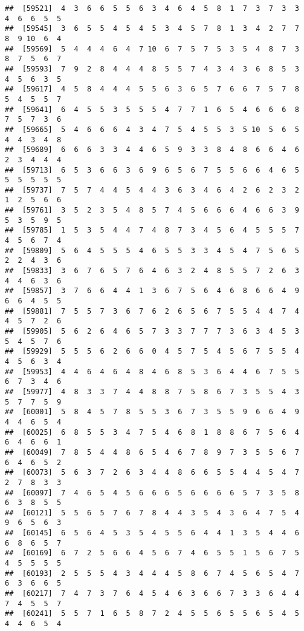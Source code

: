 \documentclass[
]{book}
\begin{document}
\begin{verbatim}
##  [59521]  4  3  6  6  5  5  6  3  4  6  4  5  8  1  7  3  7  3  3  4  6  6  5  5
##  [59545]  3  6  5  5  4  5  4  5  3  4  5  7  8  1  3  4  2  7  7  8  9 10  6  4
##  [59569]  5  4  4  4  6  4  7 10  6  7  5  7  5  3  5  4  8  7  3  8  7  5  6  7
##  [59593]  7  9  2  8  4  4  4  8  5  5  7  4  3  4  3  6  8  5  3  4  5  6  3  5
##  [59617]  4  5  8  4  4  4  5  5  6  3  6  5  7  6  6  7  5  7  8  5  4  5  5  7
##  [59641]  6  4  5  5  3  5  5  5  4  7  7  1  6  5  4  6  6  6  8  7  5  7  3  6
##  [59665]  5  4  6  6  6  4  3  4  7  5  4  5  5  3  5 10  5  6  5  4  4  3  4  8
##  [59689]  6  6  6  3  3  4  4  6  5  9  3  3  8  4  8  6  6  4  6  2  3  4  4  4
##  [59713]  6  5  3  6  6  3  6  9  6  5  6  7  5  5  6  6  4  6  5  5  5  5  5  5
##  [59737]  7  5  7  4  4  5  4  4  3  6  3  4  6  4  2  6  2  3  2  1  2  5  6  6
##  [59761]  3  5  2  3  5  4  8  5  7  4  5  6  6  6  4  6  6  3  9  5  3  5  9  5
##  [59785]  1  5  3  5  4  4  7  4  8  7  3  4  5  6  4  5  5  5  7  4  5  6  7  4
##  [59809]  5  6  4  5  5  5  4  6  5  5  3  3  4  5  4  7  5  6  5  2  2  4  3  6
##  [59833]  3  6  7  6  5  7  6  4  6  3  2  4  8  5  5  7  2  6  3  4  4  6  3  6
##  [59857]  3  7  6  6  4  4  1  3  6  7  5  6  4  6  8  6  6  4  9  6  6  4  5  5
##  [59881]  7  5  5  7  3  6  7  6  2  6  5  6  7  5  5  4  4  7  4  4  5  7  2  6
##  [59905]  5  6  2  6  4  6  5  7  3  3  7  7  7  3  6  3  4  5  3  5  4  5  7  6
##  [59929]  5  5  5  6  2  6  6  0  4  5  7  5  4  5  6  7  5  5  4  4  5  6  3  4
##  [59953]  4  4  6  4  6  4  8  4  6  8  5  3  6  4  4  6  7  5  5  6  7  3  4  6
##  [59977]  4  8  3  3  7  4  4  8  8  7  5  8  6  7  3  5  5  4  3  5  7  7  5  9
##  [60001]  5  8  4  5  7  8  5  5  3  6  7  3  5  5  9  6  6  4  9  4  4  6  5  4
##  [60025]  6  8  5  5  3  4  7  5  4  6  8  1  8  8  6  7  5  6  4  6  4  6  6  1
##  [60049]  7  8  5  4  4  8  6  5  4  6  7  8  9  7  3  5  5  6  7  6  4  6  5  2
##  [60073]  5  6  3  7  2  6  3  4  4  8  6  6  5  5  4  4  5  4  7  2  7  8  3  3
##  [60097]  7  4  6  5  4  5  6  6  6  5  6  6  6  6  5  7  3  5  8  6  3  8  5  5
##  [60121]  5  5  6  5  7  6  7  8  4  4  3  5  4  3  6  4  7  5  4  9  6  5  6  3
##  [60145]  6  5  6  4  5  3  5  4  5  5  6  4  4  1  3  5  4  4  6  6  8  6  5  7
##  [60169]  6  7  2  5  6  6  4  5  6  7  4  6  5  5  1  5  6  7  5  4  5  5  5  5
##  [60193]  2  5  5  5  4  3  4  4  4  5  8  6  7  4  5  6  5  4  7  6  3  6  6  5
##  [60217]  7  4  7  3  7  6  4  5  4  6  3  6  6  7  3  3  6  4  4  7  4  5  5  7
##  [60241]  5  5  7  1  6  5  8  7  2  4  5  5  6  5  5  6  5  4  5  4  4  6  5  4

\end{verbatim}
\end{document}
